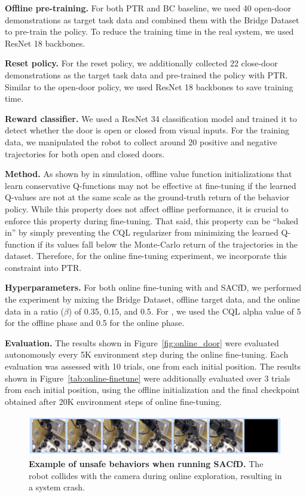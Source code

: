 \documentclass[conference]{IEEEtran}
\begin{document}
\textbf{Offline pre-training.}
For both PTR and BC baseline, we used 40 open-door demonstrations as target task data and combined them with the Bridge Dataset to pre-train the policy. To reduce the training time in the real system, we used ResNet 18 backbones.

\textbf{Reset policy.}
For the reset policy, we additionally collected 22 close-door demonstrations as the target task data and pre-trained the policy with PTR. Similar to the open-door policy, we used ResNet 18 backbones to save training time.

\textbf{Reward classifier.} We used a ResNet 34 classification model and trained it to detect whether the door is open or closed from visual inputs. For the training data, we manipulated the robot to collect around 20 positive and negative trajectories for both open and closed doors.

\textbf{Method.} As shown by \citet{nakamoto2023calql} in simulation, offline value function initializations that learn conservative Q-functions may not be effective at fine-tuning if the learned Q-values are not at the same scale as the ground-truth return of the behavior policy. While this property does not affect offline performance, it is crucial to enforce this property during fine-tuning. That said, this property can be ``baked in'' by simply preventing the CQL regularizer from minimizing the learned Q-function if its values fall below the Monte-Carlo return of the trajectories in the dataset. Therefore, for the online fine-tuning experiment, we incorporate this constraint into PTR.

\textbf{Hyperparameters.} 
For both online fine-tuning with \methodname and SACfD, we performed the experiment by mixing the Bridge Dataset, offline target data, and the online data in a ratio ($\beta$) of 0.35, 0.15, and 0.5. For \methodname, we used the CQL alpha value of 5 for the offline phase and 0.5 for the online phase. 

\textbf{Evaluation.} The results shown in Figure~\ref{fig:online_door} were evaluated autonomously every 5K environment step during the online fine-tuning. Each evaluation was assessed with 10 trials, one from each initial position. The results shown in Figure~\ref{tab:online-finetune} were additionally evaluated over 3 trials from each initial position, using the offline initialization and the final checkpoint obtained after 20K environment steps of online fine-tuning.

\begin{figure}
\includegraphics[width=\linewidth]{dangerous_actions.jpeg}
\caption{\footnotesize{\label{fig:dangerous-actions} \textbf{Example of unsafe behaviors when running SACfD.} The robot collides with the camera during online exploration, resulting in a system crash.}}
\end{figure}
\end{document}
